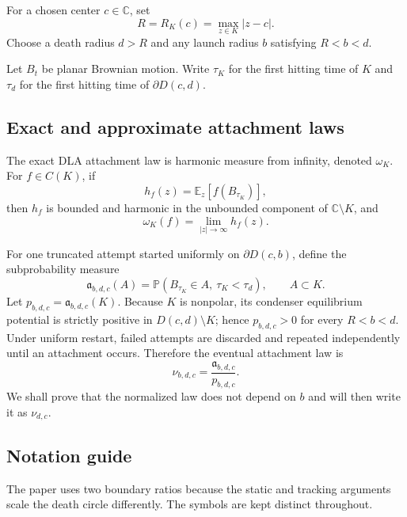 \documentclass[11pt]{article}
\theoremstyle{mainthm}
\theoremstyle{definition}
\theoremstyle{remark}
\newcommand{\C}{\mathbb C}
\newcommand{\E}{\mathbb E}
\newcommand{\Pp}{\mathbb P}
\begin{document}
For a chosen center $c\in\C$, set
\[
  R=R_K(c)=\max_{z\in K}|z-c|.
\]
Choose a death radius $d>R$ and any launch radius $b$ satisfying $R<b<d$.

Let $B_t$ be planar Brownian motion. Write $\tau_K$ for the first hitting time of $K$ and $\tau_d$ for the first hitting time of $\partial D(c,d)$.

\subsection{Exact and approximate attachment laws}

The exact DLA attachment law is harmonic measure from infinity, denoted $\omega_K$. For $f\in C(K)$, if
\[
  h_f(z)=\E_z[f(B_{\tau_K})],
\]
then $h_f$ is bounded and harmonic in the unbounded component of $\C\setminus K$, and
\[
  \omega_K(f)=\lim_{|z|\to\infty}h_f(z).
\]

For one truncated attempt started uniformly on $\partial D(c,b)$, define the subprobability measure
\[
  \mathfrak a_{b,d,c}(A)
  =\Pp(B_{\tau_K}\in A,\ \tau_K<\tau_d),
  \qquad A\subset K.
\]
Let $p_{b,d,c}=\mathfrak a_{b,d,c}(K)$. Because $K$ is nonpolar, its condenser equilibrium potential is strictly positive in $D(c,d)\setminus K$; hence $p_{b,d,c}>0$ for every $R<b<d$. Under uniform restart, failed attempts are discarded and repeated independently until an attachment occurs. Therefore the eventual attachment law is
\begin{equation}
  \nu_{b,d,c}=\frac{\mathfrak a_{b,d,c}}{p_{b,d,c}}.
  \label{eq:restart-conditioned}
\end{equation}
We shall prove that the normalized law does not depend on $b$ and will then write it as $\nu_{d,c}$.

\subsection{Notation guide}

The paper uses two boundary ratios because the static and tracking arguments scale the death circle differently. The symbols are kept distinct throughout.
\end{document}
